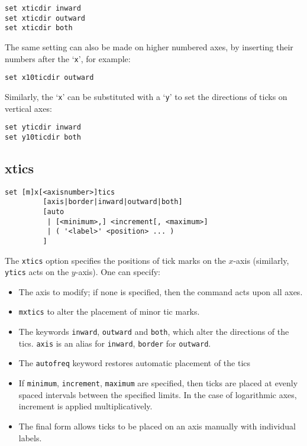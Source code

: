 \begin{verbatim}
set xticdir inward 
set xticdir outward 
set xticdir both
\end{verbatim}

The same setting can also be made on higher numbered axes, by inserting their
numbers after the `{\tt x}', for example:

\begin{verbatim}
set x10ticdir outward
\end{verbatim}

Similarly, the `{\tt x}' can be substituted with a `{\tt y}' to set the directions of ticks
on vertical axes:

\begin{verbatim}
set yticdir inward
set y10ticdir both
\end{verbatim}

\subsection{xtics}

\begin{verbatim}
set [m]x[<axisnumber>]tics 
         [axis|border|inward|outward|both] 
         [auto 
          | [<minimum>,] <increment[, <maximum>] 
          | ( '<label>' <position> ... ) 
         ] 
\end{verbatim}

The {\tt xtics} option specifies the positions of tick marks on the $x$-axis
(similarly, {\tt ytics} acts on the $y$-axis).  One can specify:

\begin{itemize}
\item The axis to modify; if none is specified, then the command acts upon all axes.

\item {\tt mxtics} to alter the placement of minor tic marks.

\item The keywords {\tt inward}, {\tt outward} and {\tt both}, which alter the
directions of the tics.  {\tt axis} is an alias for {\tt inward}, {\tt border}
for {\tt outward}.

\item The {\tt autofreq} keyword restores automatic placement of the tics

\item If {\tt minimum}, {\tt increment}, {\tt maximum} are specified, then ticks
are placed at evenly spaced intervals between the specified limits. In the case
of logarithmic axes, increment is applied multiplicatively. 

\item The final form allows ticks to be placed on an axis manually with
individual labels.
\end{itemize}
   
